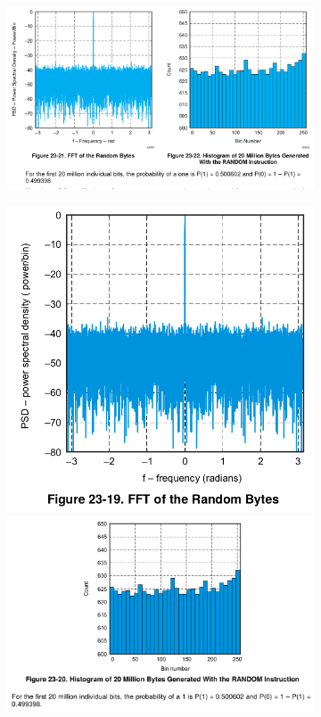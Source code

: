 \begin{figure}[ht!]
\center
\caption{Seeding Result for CC253X and CC2538}
\begin{subfigure}{0.8\linewidth}
	\includegraphics[width=\linewidth]{./figures/CC253X_Seed.png}
\end{subfigure}

\begin{subfigure}{0.8\linewidth}
	\center
	\includegraphics[width=0.55\linewidth]{./figures/CC2538_Seed1.png}
	\includegraphics[width=\linewidth]{./figures/CC2538_Seed2.png}
\end{subfigure}
\label{CC2538_CC253X_SeedComparison}
\end{figure}

